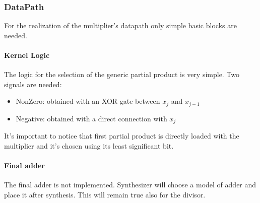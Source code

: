 \subsubsection{DataPath}
For the realization of the multiplier's datapath only simple basic blocks are needed. 
\paragraph{Kernel Logic}
The logic for the selection of the generic partial product is very simple. Two signals are needed:
\begin{itemize}
    \item NonZero: obtained with an XOR gate between $x_j$ and $x_{j-1}$
    \item Negative: obtained with a direct connection with $x_j$
\end{itemize}
It's important to notice that first partial product is directly loaded with the multiplier and it's chosen using its least significant bit.
\paragraph{Final adder}
The final adder is not implemented. Synthesizer will choose a model of adder and place it after synthesis. This will remain true also for the divisor.
